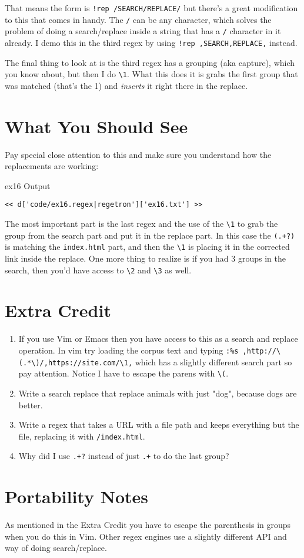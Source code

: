 That means the form is \verb|!rep /SEARCH/REPLACE/| but there's a great modification
to this that comes in handy.  The \verb|/| can be any character, which solves the
problem of doing a search/replace inside a string that has a \verb|/| character
in it already.  I demo this in the third regex by using \verb|!rep ,SEARCH,REPLACE,|
instead.

The final thing to look at is the third regex has a grouping (aka capture), which 
you know about, but then I do \verb|\1|.  What this does it is grabs the first
group that was matched (that's the 1) and \emph{inserts} it right there in the
replace.

\section{What You Should See}

Pay special close attention to this and make sure you understand how the replacements
are working:

\begin{code}{ex16 Output}
\begin{Verbatim}
<< d['code/ex16.regex|regetron']['ex16.txt'] >>
\end{Verbatim}
\end{code}

The most important part is the last regex and the use of the \verb|\1| to grab
the group from the search part and put it in the replace part.  In this case
the \verb|(.+?)| is matching the \verb|index.html| part, and then the \verb|\1|
is placing it in the corrected link inside the replace.  One more thing to
realize is if you had 3 groups in the search, then you'd have access to \verb|\2|
and \verb|\3| as well.

\section{Extra Credit}

\begin{enumerate}
\item If you use Vim or Emacs then you have access to this as a search and 
    replace operation.  In vim try loading the corpus text and typing 
    \verb|:%s ,http://\(.*\)/,https://site.com/\1,|
    which has a slightly different search part so pay attention.  Notice
    I have to escape the parens with \verb|\(|.
\item Write a search replace that replace animals with just "dog", because
    dogs are better.
\item Write a regex that takes a URL with a file path and keeps everything
    but the file, replacing it with \verb|/index.html|.
\item Why did I use \verb|.+?| instead of just \verb|.+| to do the last group?
\end{enumerate}

\section{Portability Notes}

As mentioned in the Extra Credit you have to escape the parenthesis in
groups when you do this in Vim.  Other regex engines use a slightly
different API and way of doing search/replace.

